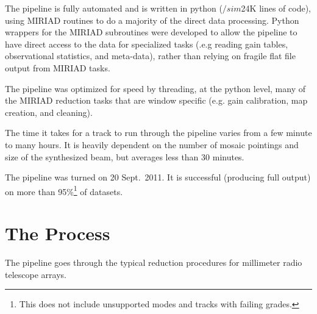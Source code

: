 The pipeline is fully automated and is written in python ($/sim$24K lines of code), using MIRIAD \citep{stw95} routines to do a majority of the direct data processing. Python wrappers for the MIRIAD subroutines were developed to allow the pipeline to have direct access to the data for specialized tasks (.e.g reading gain tables, observational statistics, and meta-data), rather than relying on fragile flat file output from MIRIAD tasks.

The pipeline was optimized for speed by threading, at the python level, many of the MIRIAD reduction tasks that are window specific (e.g. gain calibration, map creation, and cleaning).

The time it takes for a track to run through the pipeline varies from a few minute to many hours. It is heavily dependent on the number of mosaic pointings and size of the synthesized beam, but averages less than 30 minutes.

The pipeline was turned on 20 Sept.\ 2011. It is successful (producing full output) on more than 95\%\footnote{This does not include unsupported modes and tracks with failing grades.} of datasets.

\section{The Process}

The pipeline goes through the typical reduction procedures for millimeter radio telescope arrays.

